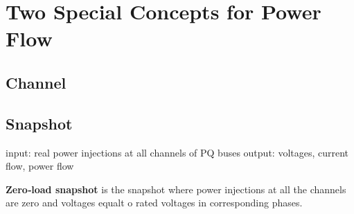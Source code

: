\documentclass[
]{book}
\begin{document}
\hypertarget{two-special-concepts-for-power-flow}{%
\chapter{Two Special Concepts for Power Flow}\label{two-special-concepts-for-power-flow}}

\hypertarget{channel}{%
\section{Channel}\label{channel}}

\hypertarget{snapshot}{%
\section{Snapshot}\label{snapshot}}

input: real power injections at all channels of PQ buses
output: voltages, current flow, power flow

\textbf{Zero‐load snapshot} is the snapshot where power injections at all the
channels are zero and voltages equalt o rated voltages in corresponding phases.

\citet{deka2017structure}

  
\end{document}
